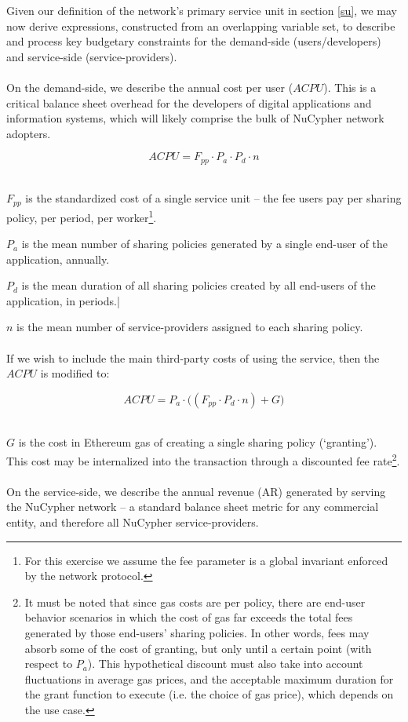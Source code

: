 \documentclass[longbibliography,nofootinbib]{revtex4-1}
\begin{document}
Given our definition of the network's primary service unit in section \ref{su}, we may now derive expressions, constructed from an overlapping variable set, to describe and process key budgetary constraints for the demand-side (users/developers) and service-side (service-providers).
\\\\
On the demand-side, we describe the annual cost per user ($ACPU$). This is a critical balance sheet overhead for the developers of digital applications and information systems, which will likely comprise the bulk of NuCypher network adopters.

\begin{equation}
    ACPU = F_{pp} \cdot P_a \cdot P_d \cdot n  
\end{equation} \

$F_{pp}$ is the standardized cost of a single service unit – the fee users pay per sharing policy, per period, per worker\footnote{For this exercise we assume the fee parameter is a global invariant enforced by the network protocol.}.

$P_a$ is the mean number of sharing policies generated by a single end-user of the application, annually.

$P_d$ is the mean duration of all sharing policies created by all end-users of the application, in periods.|

$n$ is the mean number of service-providers assigned to each sharing policy.
\\\\
If we wish to include the main third-party costs of using the service, then the $ACPU$ is modified to: 

\begin{equation}
    ACPU =  P_a \cdot \big((F_{pp} \cdot P_d \cdot n) + G\big)
\end{equation} \

$G$ is the cost in Ethereum gas of creating a single sharing policy (`granting'). This cost may be internalized into the transaction through a discounted fee rate\footnote{It must be noted that since gas costs are per policy, there are end-user behavior scenarios in which the cost of gas far exceeds the total fees generated by those end-users' sharing policies. In other words, fees may absorb some of the cost of granting, but only until a certain point (with respect to $P_a$). This hypothetical discount must also take into account fluctuations in average gas prices, and the acceptable maximum duration for the grant function to execute (i.e. the choice of gas price), which depends on the use case.}.
\\\\
On the service-side, we describe the annual revenue (AR) generated by serving the NuCypher network – a standard balance sheet metric for any commercial entity, and therefore all NuCypher service-providers. 
\end{document}
